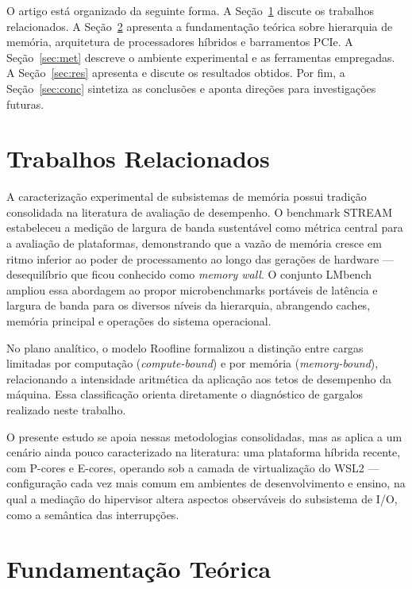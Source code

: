\documentclass[12pt]{article}
\begin{document}
O artigo está organizado da seguinte forma. A Seção~\ref{sec:rel} discute os trabalhos relacionados. A Seção~\ref{sec:fund} apresenta a fundamentação teórica sobre hierarquia de memória, arquitetura de processadores híbridos e barramentos PCIe. A Seção~\ref{sec:met} descreve o ambiente experimental e as ferramentas empregadas. A Seção~\ref{sec:res} apresenta e discute os resultados obtidos. Por fim, a Seção~\ref{sec:conc} sintetiza as conclusões e aponta direções para investigações futuras.

\section{Trabalhos Relacionados}
\label{sec:rel}

A caracterização experimental de subsistemas de memória possui tradição consolidada na literatura de avaliação de desempenho. O benchmark STREAM \cite{mccalpin1995} estabeleceu a medição de largura de banda sustentável como métrica central para a avaliação de plataformas, demonstrando que a vazão de memória cresce em ritmo inferior ao poder de processamento ao longo das gerações de hardware --- desequilíbrio que ficou conhecido como \textit{memory wall}. O conjunto LMbench \cite{mcvoy1996} ampliou essa abordagem ao propor microbenchmarks portáveis de latência e largura de banda para os diversos níveis da hierarquia, abrangendo caches, memória principal e operações do sistema operacional.

No plano analítico, o modelo Roofline \cite{williams2009} formalizou a distinção entre cargas limitadas por computação (\textit{compute-bound}) e por memória (\textit{memory-bound}), relacionando a intensidade aritmética da aplicação aos tetos de desempenho da máquina. Essa classificação orienta diretamente o diagnóstico de gargalos realizado neste trabalho.

O presente estudo se apoia nessas metodologias consolidadas, mas as aplica a um cenário ainda pouco caracterizado na literatura: uma plataforma híbrida recente, com P-cores e E-cores, operando sob a camada de virtualização do WSL2 --- configuração cada vez mais comum em ambientes de desenvolvimento e ensino, na qual a mediação do hipervisor altera aspectos observáveis do subsistema de I/O, como a semântica das interrupções.

\section{Fundamentação Teórica}
\label{sec:fund}
\end{document}
